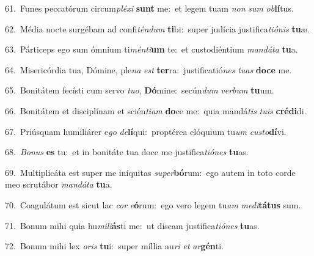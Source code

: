 {\numbfont\textcolor{\numbcolor}{61.}}~Funes peccatórum circum\-\textit{plé}\-\textit{xi} \textbf{sunt} me:~\star et legem tuam \textit{non} \textit{sum} \textit{ob}\-\textbf{lí}tus.\par
{\numbfont\textcolor{\numbcolor}{62.}}~Média nocte surgébam ad confi\-\textit{tén}\-\textit{dum} \textbf{ti}\-bi:~\star super judícia justifica\-\textit{ti}\-\textit{ó}\textit{nis} \textbf{tu}\-æ.\par
{\numbfont\textcolor{\numbcolor}{63.}}~Párticeps ego sum ómnium ti\-\textit{mén}\-\textit{ti}\textbf{um} te:~\star et custodiéntium \textit{man}\-\textit{dá}\textit{ta} \textbf{tu}\-a.\par
{\numbfont\textcolor{\numbcolor}{64.}}~Misericórdia tua, Dómine, ple\textit{na} \textit{est} \textbf{ter}\-ra:~\star justificatió\textit{nes} \textit{tu}\-\textit{as} \textbf{do}\-\textbf{ce} me.\par
{\numbfont\textcolor{\numbcolor}{65.}}~Bonitátem fecísti cum servo \textit{tu}\-\textit{o}, \textbf{Dó}\-mine:~\star secún\textit{dum} \textit{ver}\-\textit{bum} \textbf{tu}\-um.\par
{\numbfont\textcolor{\numbcolor}{66.}}~Bonitátem et disciplínam et scién\-\textit{ti}\-\textit{am} \textbf{do}\-ce me:~\star quia mandá\textit{tis} \textit{tu}\-\textit{is} \textbf{cré}\-\textbf{di}di.\par
{\numbfont\textcolor{\numbcolor}{67.}}~Priúsquam humiliárer e\textit{go} \textit{de}\-\textbf{lí}qui:~\star proptérea elóquium tu\textit{um} \textit{cus}\-\textit{to}\textbf{dí}vi.\par
{\numbfont\textcolor{\numbcolor}{68.}}~\-\textit{Bo}\-\textit{nus} \textbf{es} tu:~\star et in bonitáte tua doce me justifica\-\textit{ti}\-\textit{ó}\textit{nes} \textbf{tu}\-as.\par
{\numbfont\textcolor{\numbcolor}{69.}}~Multiplicáta est super me iníquitas \textit{su}\-\textit{per}\textbf{bó}rum:~\star ego autem in toto corde meo scrutábor \textit{man}\-\textit{dá}\textit{ta} \textbf{tu}\-a.\par
{\numbfont\textcolor{\numbcolor}{70.}}~Coagulátum est sicut lac \textit{cor} \textit{e}\-\textbf{ó}rum:~\star ego vero legem tu\textit{am} \textit{me}\-\textit{di}\textbf{tá}\textbf{tus} sum.\par
{\numbfont\textcolor{\numbcolor}{71.}}~Bonum mihi quia hu\-\textit{mi}\-\textit{li}\textbf{ás}ti me:~\star ut discam justifica\-\textit{ti}\-\textit{ó}\textit{nes} \textbf{tu}\-as.\par
{\numbfont\textcolor{\numbcolor}{72.}}~Bonum mihi lex \textit{o}\-\textit{ris} \textbf{tu}\-i:~\star super míllia au\textit{ri} \textit{et} \textit{ar}\-\textbf{gén}ti.\par
